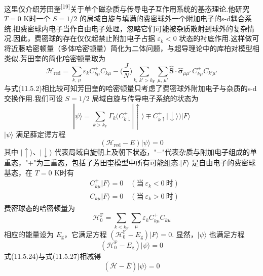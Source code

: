 这里仅介绍芳田奎\textsuperscript{[19]}关于单个磁杂质与传导电子互作用系统的基态理论.他研究 $T=0$ K时一个 $S=1/2$ 的局域自旋与填满的费密球外一个附加电子的s-d耦合系统.把费密球内电子当作自由电子处理，忽略它们可能被杂质散射到球外的复杂情况.因此，费密球的存在仅仅起禁止附加电子占据 $\varepsilon_{k}<0$ 状态的衬底作用.这样做可将近藤哈密顿量（多体哈密顿量）简化为二体问题，与超导理论中的库柏对模型相类似.芳田奎的简化哈密顿量取为
\begin{equation}
  \mathscr{H}_{\mathrm{red}}=\sum_{k,\,\mu}\varepsilon_{k}C^{+}_{k\mu}C_{k\mu}
  -\biggl(\frac{J}{N}\biggr)\sum_{k,\,k'>k_{\mathrm{F}}}\sum_{\mu,\,\mu'}
  \hat{\boldsymbol{S}}\cdot\hat{\boldsymbol{\sigma}}_{\mu\mu'}\,
  C^{+}_{k\mu}C_{k'\mu'}
\end{equation}
与式(11.5.2)相比较可知芳田奎的哈密顿量只考虑了费密球外附加电子与杂质的s-d交换作用.我们可设 $S=1/2$ 局域自旋与传导电子系统的状态为
\begin{equation}
  |\psi\rangle=\sum_{k>k_{\mathrm{F}}}\Gamma_{k}
  \bigl(C^{+}_{k\downarrow}|\uparrow\rangle
  \mp C^{+}_{k\uparrow}|\downarrow\rangle\bigr)|F\rangle
\end{equation}
$|\psi\rangle$ 满足薛定谔方程
\begin{equation}
  (\mathscr{H}_{\mathrm{red}}-E)|\psi\rangle=0
\end{equation}
其中 $|\uparrow\rangle$、$|\downarrow\rangle$ 代表局域自旋朝上及朝下状态，"$-$"代表杂质与附加电子组成的单重态，"$+$"为三重态，包括了芳田奎模型中所有可能组态.$|F\rangle$ 是自由电子的费密球基态，在 $T=0$ K时有
\begin{equation}
\begin{aligned}
  &C^{+}_{k\mu}|F\rangle=0\quad(\text{当}\ \varepsilon_{k}<0\ \text{时})\\
  &C_{k\mu}|F\rangle=0\quad(\text{当}\ \varepsilon_{k}>0\ \text{时})
\end{aligned}
\end{equation}
费密球态的哈密顿量为
\begin{equation}
  \mathscr{H}^{\mathrm{F}}_{0}
  =\sum_{k<k_{\mathrm{F}}}\sum_{\mu}\varepsilon_{k}C^{+}_{k\mu}C_{k\mu}
\end{equation}
相应的能量设为 $E_{\mathrm{g}}$，它满足方程
$(\mathscr{H}^{\mathrm{F}}_{0}-E_{\mathrm{g}})|F\rangle=0$.
显然，$|\psi\rangle$ 也满足方程
\begin{equation}
  (\mathscr{H}^{\mathrm{F}}_{0}-E_{\mathrm{g}})|\psi\rangle=0
\end{equation}
式(11.5.24)与式(11.5.27)相减得
\begin{equation}
  (\overline{\mathscr{H}}-\overline{E})|\psi\rangle=0
\end{equation}
